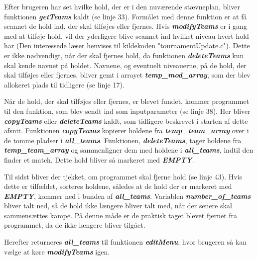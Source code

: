 \par
Efter brugeren har set hvilke hold, der er i den nuværende stævneplan, bliver funktionen \textbf{\textit{getTeams}} kaldt (se linje 33). Formålet med denne funktion er at få scannet de hold ind, der skal tilføjes eller fjernes. Hvis \textbf{\textit{modifyTeams}} er i gang med at tilføje hold, vil der yderligere blive scannet ind hvilket niveau hvert hold har (Den interessede læser henvises til kildekoden "tournamentUpdate.c"). Dette er ikke nødvendigt, når der skal fjernes hold, da funktionen \textbf{\textit{deleteTeams}} kun skal kende navnet på holdet. Navnene, og eventuelt niveauerne, på de hold, der skal tilføjes eller fjernes, bliver gemt i arrayet \textbf{\textit{temp\_mod\_array}}, som der blev allokeret plads til tidligere (se linje 17). 
\par
Når de hold, der skal tilføjes eller fjernes, er blevet fundet, kommer programmet til den funktion, som blev sendt ind som inputparameter (se linje 38). Her bliver \textbf{\textit{copyTeams}} eller \textbf{\textit{deleteTeams}} kaldt, som tidligere beskrevet i starten af dette afsnit. Funktionen \textbf{\textit{copyTeams}} kopierer holdene fra \textbf{\textit{temp\_team\_array}} over i de tomme pladser i \textbf{\textit{all\_teams}}. Funktionen, \textbf{\textit{deleteTeams}}, tager holdene fra \textbf{\textit{temp\_team\_array}} og sammenligner dem med holdene i \textbf{\textit{all\_teams}}, indtil den finder et match. Dette hold bliver så markeret med \textbf{\textit{EMPTY}}.
\par
Til sidst bliver der tjekket, om programmet skal fjerne hold (se linje 43). Hvis dette er tilfældet, sorteres holdene, således at de hold der er markeret med \textbf{\textit{EMPTY}}, kommer ned i bunden af \textbf{\textit{all\_teams}}. Variablen \textbf{\textit{number\_of\_teams}} bliver talt ned, så de hold ikke længere bliver talt med, når der senere skal sammensættes kampe. På denne måde er de praktisk taget blevet fjernet fra programmet, da de ikke længere bliver tilgået. 
\par
Herefter returneres \textbf{\textit{all\_teams}} til funktionen \textbf{\textit{editMenu}}, hvor brugeren så kan vælge at køre \textbf{\textit{modifyTeams}} igen. 


